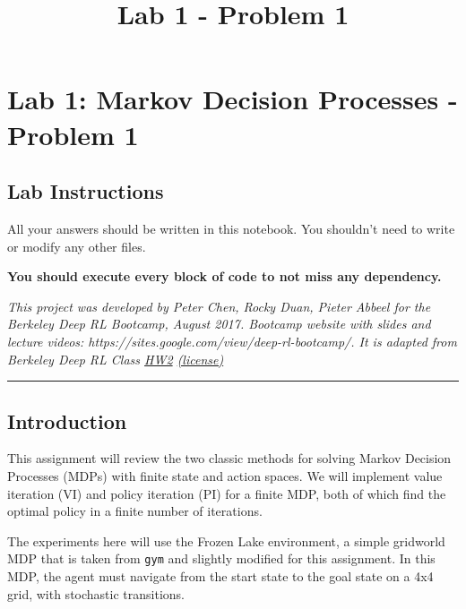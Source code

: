 \documentclass[11pt]{article}
\title{Lab 1 - Problem 1}
\begin{document}
    
    
    \maketitle
    
    

    
    \section{Lab 1: Markov Decision Processes - Problem
1}\label{lab-1-markov-decision-processes---problem-1}

\subsection{Lab Instructions}\label{lab-instructions}

All your answers should be written in this notebook. You shouldn't need
to write or modify any other files.

\textbf{You should execute every block of code to not miss any
dependency.}

\emph{This project was developed by Peter Chen, Rocky Duan, Pieter
Abbeel for the Berkeley Deep RL Bootcamp, August 2017. Bootcamp website
with slides and lecture videos:
https://sites.google.com/view/deep-rl-bootcamp/. It is adapted from
Berkeley Deep RL Class
\href{https://github.com/berkeleydeeprlcourse/homework/blob/c1027d83cd542e67ebed982d44666e0d22a00141/hw2/HW2.ipynb}{HW2}
\href{https://github.com/berkeleydeeprlcourse/homework/blob/master/LICENSE}{(license)}}

\begin{center}\rule{0.5\linewidth}{\linethickness}\end{center}

    \subsection{Introduction}\label{introduction}

This assignment will review the two classic methods for solving Markov
Decision Processes (MDPs) with finite state and action spaces. We will
implement value iteration (VI) and policy iteration (PI) for a finite
MDP, both of which find the optimal policy in a finite number of
iterations.

The experiments here will use the Frozen Lake environment, a simple
gridworld MDP that is taken from \texttt{gym} and slightly modified for
this assignment. In this MDP, the agent must navigate from the start
state to the goal state on a 4x4 grid, with stochastic transitions.
\end{document}
